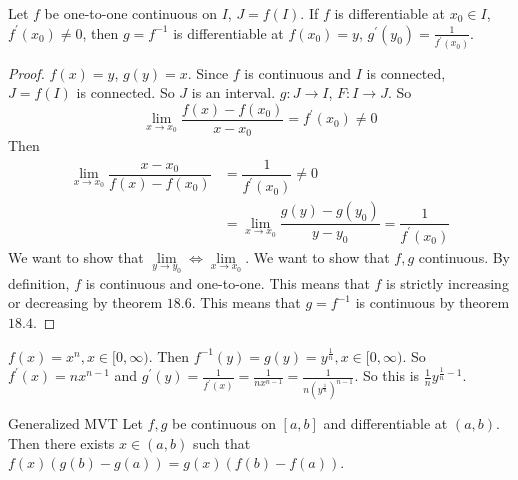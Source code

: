 \documentclass{report}
\begin{document}
\begin{theorem}{29.9}
    Let $f$ be one-to-one continuous on $I$, $J = f(I)$. If $f$ is differentiable at $x_{0} \in I$, $f^{\prime}(x_{0}) \neq 0$, then $g = f^{-1}$ is differentiable at $f(x_{0}) = y$, $g^{\prime}(y_{0}) = \frac{1}{f^{\prime}(x_{0})}$.
\end{theorem}
    \begin{proof}
        $f(x) = y$, $g(y) = x$. Since $f$ is continuous and $I$ is connected, $J = f(I)$ is connected. So $J$ is an interval. $g : J \rightarrow I$, $F : I \rightarrow J$. So
            \begin{equation*}
                \lim\limits_{x \to x_{0}} \dfrac{f(x) - f(x_{0})}{x - x_{0}} = f^{\prime}(x_{0}) \neq 0
            \end{equation*}
        Then 
            \begin{align*}
                \lim\limits_{x \to x_{0}}\dfrac{x - x_{0}}{f(x) - f(x_{0})} &= \dfrac{1}{f^{\prime}(x_{0})} \neq 0                                                        \\
                                                                            &= \lim\limits_{x \to x_{0}}\dfrac{g(y) - g(y_{0})}{y - y_{0}} = \dfrac{1}{f^{\prime}(x_{0})}   
            \end{align*}
        We want to show that $\lim\limits_{y \to y_{0}} \iff \lim\limits_{x \to x_{0}}$. We want to show that $f, g$ continuous. By definition, $f$ is continuous and one-to-one. This means that $f$ is strictly increasing or decreasing by theorem $18.6$. This means that $g = f^{-1}$ is continuous by theorem $18.4$.
    \end{proof} 

\begin{examples}
    \begin{example}
        $f(x) = x^{n}, x \in [0, \infty)$. Then $f^{-1}(y) = g(y) = y^{\frac{1}{n}}, x \in [0, \infty)$. So $f^{\prime}(x) = nx^{n - 1}$ and $g^{\prime}(y) = \frac{1}{f^{\prime}(x)} = \frac{1}{nx^{n - 1}} = \frac{1}{n(y^{\frac{1}{n}})^{n - 1}}$. So this is $\frac{1}{n}y^{\frac{1}{n} - 1}$.
    \end{example}
\end{examples}

\begin{theorem}{Generalized MVT}
    Let $f, g$ be continuous on $[a, b]$ and differentiable at $(a, b)$. Then there exists $x \in (a, b)$ such that $f(x) (g(b) - g(a)) = g(x) (f(b) - f(a))$.
\end{theorem}
\end{document}
